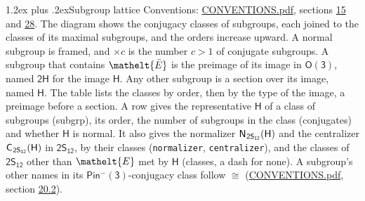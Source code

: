 \documentclass[10pt,a4paper]{article}
\makeatletter
\renewcommand\section{\@startsection{section}{1}{\z@}{-3ex plus -1ex minus -.2ex}%
  {1.2ex plus .2ex}{\normalfont\large\sffamily\bfseries\color{parttitle}}}
\numberwithin{equation}{section}
\newcommand{\eltfont}[1]{{\let\sigma\eltsigma\mathelt{#1}}}
\newcommand{\grp}[1]{\mathsf{#1}}
\newcommand{\cls}[1]{\eltfont{#1}}
\newcommand{\elt}[1]{\eltfont{#1}}
\newcommand{\samecls}{\cong}
\newcommand{\barred}[1]{\bar{#1}}
\newcommand{\hairsp}{\mkern1mu}
\makeatother
\begin{document}
\section{Subgroup lattice}\label{s:subgroups}
Conventions: \href{../../CONVENTIONS.pdf}{CONVENTIONS.pdf}, sections \href{../../../rotation/CONVENTIONS.pdf\#conv.15}{15} and \href{../../CONVENTIONS.pdf\#conv.28}{28}.
The diagram shows the conjugacy classes of subgroups, each joined to the classes of its maximal subgroups, and the orders increase upward. \label{n:index.conjugates.c}A normal subgroup is framed, and ${\times}c$ is the number $c > 1$ of conjugate subgroups. \label{n:group.H}A subgroup that contains $\elt{\barred{E}}$ is the preimage of its image in $\grp{O(3)}$, named $\grp{2H}$ for the image $\grp{H}$. Any other subgroup is a section over its image, named $\grp{H}$. The table lists the classes by order, then by the type of the image, a preimage before a section. \label{n:head.subgroup}\label{n:head.order}\label{n:head.conjugates}\label{n:head.normal}A row gives the representative $\grp{H}$ of a class of subgroups (subgrp), its order, the number of subgroups in the class (conjugates) and whether $\grp{H}$ is normal. \label{n:group.normalizer}\label{n:group.centralizer}\label{n:head.classes}It also gives the normalizer $\grp{N}_{\hairsp \grp{2S_{12}}}(\grp{H})$ and the centralizer $\grp{C}_{\hairsp \grp{2S_{12}}}(\grp{H})$ in $\grp{2S_{12}}$, by their classes (\texttt{normalizer}, \texttt{centralizer}), and the classes of $\grp{2S_{12}}$ other than $\cls{E}$ met by $\grp{H}$ (classes, a dash for none). A subgroup's other names in its \href{Pinminus3.pdf}{$\grp{Pin^{-}(3)}$}-conjugacy class follow $\samecls$ (\href{../../CONVENTIONS.pdf}{CONVENTIONS.pdf}, section \href{../../CONVENTIONS.pdf\#conv.20.2}{20.2}).
\begin{center}
\end{center}
\end{document}
